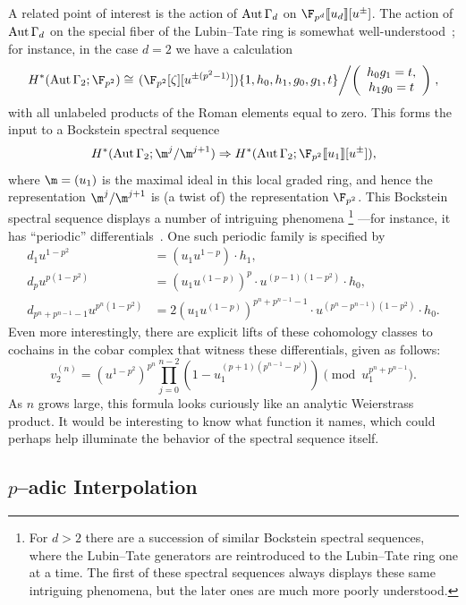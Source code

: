 A related point of interest is the action of \(\operatorname{Aut} \Gamma_d\) on \(\F_{p^d}\ps{u_d}[u^\pm]\).
The action of \(\operatorname{Aut} \Gamma_d\) on the special fiber of the Lubin--Tate ring is somewhat well-understood~\cite{RavenelCohomologyStabAlgs}; for instance, in the case \(d = 2\) we have a calculation \[H^*(\Aut \Gamma_2; \F_{p^2}) \cong \left.(\F_{p^2}[\zeta][u^{\pm(p^2-1)}])\{1, h_0, h_1, g_0, g_1, t\}\middle/\left(\begin{array}{c} h_0 g_1 = t, \\ h_1 g_0 = t \end{array}\right)\right. ,\] with all unlabeled products of the Roman elements equal to zero.
This forms the input to a Bockstein spectral sequence \[H^*(\Aut \Gamma_2; \m^j / \m^{j+1}) \Rightarrow H^*(\Aut \Gamma_2; \F_{p^2}\ps{u_1}[u^\pm]),\] where \(\m = (u_1)\) is the maximal ideal in this local graded ring, and hence the representation \(\m^j / \m^{j+1}\) is (a twist of) the representation \(\F_{p^2}\).
This Bockstein spectral sequence displays a number of intriguing phenomena%
\footnote{%
For \(d > 2\) there are a succession of similar Bockstein spectral sequences, where the Lubin--Tate generators are reintroduced to the Lubin--Tate ring one at a time.
The first of these spectral sequences always displays these same intriguing phenomena, but the later ones are much more poorly understood.
}%
---for instance, it has ``periodic'' differentials~\cite{Sadofsky}.
One such periodic family is specified by
\begin{align*}
d_1 u^{1-p^2} & = (u_1 u^{1-p}) \cdot h_1, \\
d_p u^{p(1-p^2)} & = (u_1 u^{(1-p)})^p \cdot u^{(p-1)(1-p^2)} \cdot h_0, \\
d_{p^n+p^{n-1}-1} u^{p^n(1-p^2)} & = 2 (u_1 u^{(1-p)})^{p^n + p^{n-1} - 1} \cdot u^{(p^n - p^{n-1})(1 - p^2)} \cdot h_0.
\end{align*}
Even more interestingly, there are explicit lifts of these cohomology classes to cochains in the cobar complex that witness these differentials, given as follows: \[v_2^{(n)} = (u^{1-p^2})^{p^n} \prod_{j=0}^{n-2} \left(1 - u_1^{(p+1)(p^{n-1} - p^j)} \right) \pmod{u_1^{p^n + p^{n-1}}}.\]
As \(n\) grows large, this formula looks curiously like an analytic Weierstrass product.
It would be interesting to know what function it names, which could perhaps help illuminate the behavior of the spectral sequence itself.





\subsection*{\(p\)--adic Interpolation}

